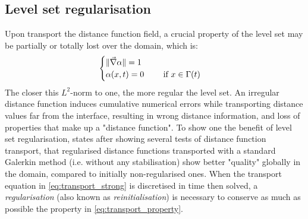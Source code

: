 \subsection{Level set regularisation}
%
Upon transport the distance function field, a crucial property of the level set may be partially or totally 
lost over the domain, which is:
\begin{align}
\label{eq:transport_property}
\begin{cases}
\lVert \vec{\nabla} \alpha \rVert = 1 \\ 
\alpha (x,t) = 0 	\qquad  \text{ if } x \in \Gamma(t)
\end{cases}
\end{align}
The closer this $L^2$-norm to one, the more regular the level set. An irregular distance function induces 
cumulative numerical errors while transporting distance values far from the interface,
resulting in wrong distance information, and loss of properties that make up a "distance function".
To show one the benefit of level set regularisation, \citet{basset_simulation_2006} states 
after showing several tests of distance function transport, that
regularised distance functions transported with a standard Galerkin method (i.e. without any stabilisation) 
show better "quality" globally in the domain, compared to initially non-regularised ones.
When the transport equation in \cref{eq:transport_strong} is discretised in time then solved, a \emph{regularisation} 
(also known as \emph{reinitialisation}) is necessary to conserve as much as 
possible the property in \cref{eq:transport_property}.

